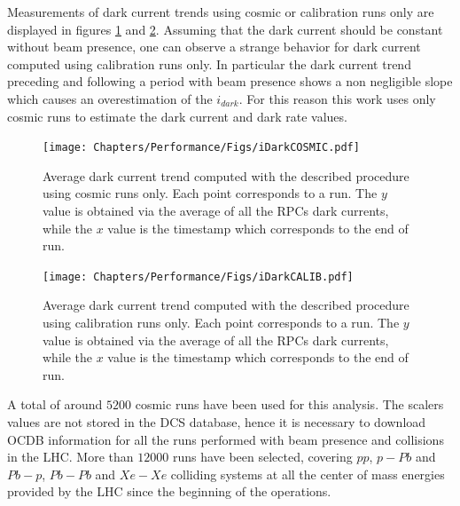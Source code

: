 Measurements of dark current trends using cosmic or calibration runs only are displayed in figures \ref{fig:iDarkCOSMIC} and \ref{fig:iDarkCALIB}.
Assuming that the dark current should be constant without beam presence, one can observe a strange behavior for dark current computed using calibration runs only.
In particular the dark current trend preceding and following a period with beam presence shows a non negligible slope which causes an overestimation of the $i_{dark}$.
For this reason this work uses only cosmic runs to estimate the dark current and dark rate values.

\begin{figure}[!t]
\begin{center}
\texttt{[image: Chapters/Performance/Figs/iDarkCOSMIC.pdf]}
\caption{Average dark current trend computed with the described procedure using cosmic runs only. Each point corresponds to a run. The $y$ value is obtained via the average of all the RPCs dark currents, while the $x$ value is the timestamp which corresponds to the end of run.}
\label{fig:iDarkCOSMIC}
\end{center}
\end{figure}

\begin{figure}[!t]
\begin{center}
\texttt{[image: Chapters/Performance/Figs/iDarkCALIB.pdf]}
\caption{Average dark current trend computed with the described procedure using calibration runs only. Each point corresponds to a run. The $y$ value is obtained via the average of all the RPCs dark currents, while the $x$ value is the timestamp which corresponds to the end of run.}
\label{fig:iDarkCALIB}
\end{center}
\end{figure}

A total of around $5200$ cosmic runs have been used for this analysis.
The scalers values are not stored in the DCS database, hence it is necessary to download OCDB information for all the runs performed with beam presence and collisions in the LHC.
More than $12000$ runs have been selected, covering $pp$, $p-Pb$ and $Pb-p$, $Pb-Pb$ and $Xe-Xe$ colliding systems at all the center of mass energies provided by the LHC since the beginning of the operations.


